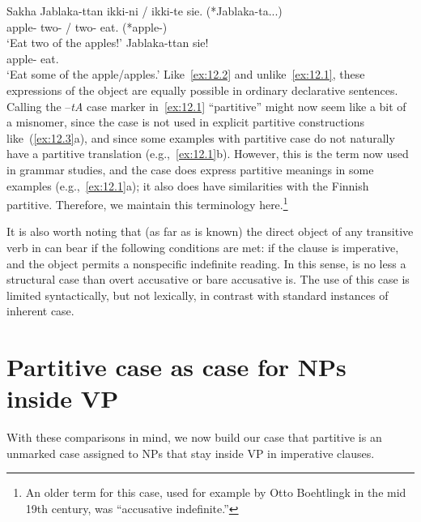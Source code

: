 \documentclass[output=paper]{langsci/langscibook}
\begin{document}
\ea\label{ex:12.3}Sakha
	\ea
		\gll Jablaka-ttan   ikki-ni / ikki-te sie. (*Jablaka-ta...)\\
			apple-\Abl{}      two-\Acc{} / two-\Part{}  eat.\Imp{} (*apple-\Part{})\\
		\glt ‘Eat two of the apples!’
	\ex
		\gll Jablaka-ttan sie!\\
			apple-\Abl{} eat.\Imp{}\\
		\glt ‘Eat some of the apple/apples.’
	\z
\z
Like~\eqref{ex:12.2} and unlike~\eqref{ex:12.1}, these expressions of the object are equally possible
in ordinary declarative sentences. Calling the –\emph{tA} case marker in~\eqref{ex:12.1}
“partitive” might now seem like a bit of a misnomer, since the case is not used
in explicit partitive constructions like~(\ref{ex:12.3}a), and since some examples with
partitive case do not naturally have a partitive translation (e.g.,~\ref{ex:12.1}b).
However, this is the term now used in  grammar studies, and the case does
express partitive meanings in some examples (e.g.,~\ref{ex:12.1}a); it also does have
similarities with the Finnish partitive. Therefore, we maintain this
terminology here.\footnote{An older term for this case, used for example by
Otto Boehtlingk in the mid 19th century, was “accusative
indefinite.”}

It is also worth noting that (as far as is known) the direct object of any
transitive verb in  can bear  if the following
conditions are met: if the clause is imperative, and the object
permits a nonspecific indefinite reading.  In this sense, 
is no less a structural case than overt accusative or bare
accusative is. The use of this case is limited
syntactically, but not lexically, in contrast with standard instances of
inherent case.

\section{Partitive case as case for NPs inside VP}

With these comparisons in mind, we now build our case that partitive is an
unmarked case assigned to NPs that stay inside VP in imperative clauses.
\end{document}

